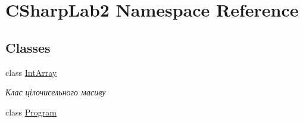 \hypertarget{namespace_c_sharp_lab2}{}\section{C\+Sharp\+Lab2 Namespace Reference}
\label{namespace_c_sharp_lab2}
\subsection*{Classes}
\begin{DoxyCompactItemize}
\item 
class \hyperlink{class_c_sharp_lab2_1_1_int_array}{Int\+Array}
\begin{DoxyCompactList}\small\item\em Клас цілочисельного масиву \end{DoxyCompactList}\item 
class \hyperlink{class_c_sharp_lab2_1_1_program}{Program}
\end{DoxyCompactItemize}
